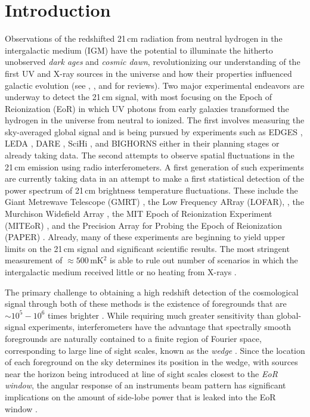 \documentclass[twocolumn]{emulateapj}
\begin{document}
\section{Introduction}
Observations of the redshifted 21\,cm radiation from neutral hydrogen in the intergalactic medium (IGM) have the potential to illuminate the hitherto unobserved {\it dark ages} and {\it cosmic dawn}, revolutionizing our understanding of the first UV and X-ray sources in the universe and how their properties influenced galactic evolution (see \citet{Furlanetto:2006Review}, \citet{Morales:2010}, and \citet{Pritchard:2012} for reviews). Two major experimental endeavors are underway to detect the 21\,cm signal, with most focusing on the Epoch of Reionization (EoR) in which UV photons from early galaxies transformed the hydrogen in the universe from neutral to ionized. The first involves measuring the sky-averaged global signal and is being pursued by experiments such as EDGES \citep{Bowman:2010}, LEDA \citep{Greenhill:2012,Bernardi:2015}, DARE \citep{Burns:2012}, SciHi \citep{Voytek:2014}, and BIGHORNS \citep{Sokolowski:2015} either in their planning stages or already taking data. The second attempts to observe spatial  fluctuations in the 21\,cm emission using radio interferometers. A first generation of such experiments are currently taking data in an attempt to make a first statistical detection of the power spectrum of 21\,cm brightness temperature fluctuations. These include the Giant Metrewave Telescope (GMRT)  \citep{Paciga:2013}, the Low Frequency ARray (LOFAR), \citep{VanHaarlem:2013}, the Murchison Widefield Array \citep{Tingay:2013a}, the MIT Epoch of Reionization Experiment (MITEoR) \citep{Zheng:2013}, and the Precision Array for Probing the Epoch of Reionization (PAPER) \citep{Parsons:2010}. Already, many of these experiments are beginning to yield upper limits on the 21\,cm signal \citep{Dillon:2013,Parsons:2014,Jacobs:2015,Dillon:2015} and significant scientific results. The most stringent measurement of $\approx 500$\,mK$^2$ \citep{Ali:2015} is able to rule out number of scenarios in which the intergalactic medium received little or no heating from X-rays \citep{Pober:2015,Greig:2015b}. 

The primary challenge to obtaining a high redshift detection of the cosmological signal through both of these methods is the existence of foregrounds that are $\sim 10^5-10^6$ times brighter \citep{Bernardi:2009,Pober:2013a,Dillon:2014}. While requiring much greater sensitivity than global-signal experiments, interferometers have the advantage that spectrally smooth foregrounds are naturally contained to a finite region of Fourier space, corresponding to large line of sight scales, known as the {\it wedge} \citep{Datta:2010,Vedantham:2012,Parsons:2012,Thyagarajan:2013,Liu:2014a,Liu:2014b}. Since the location of each foreground on the sky determines its position in the wedge, with sources near the horizon being introduced at line of sight scales closest to the {\it EoR window}, the angular response of an instruments beam pattern has significant implications on the amount of side-lobe power that is leaked into the EoR window \citep{Thyagarajan:2015a,Thyagarajan:2015b,Pober:2016}.  
\end{document}
